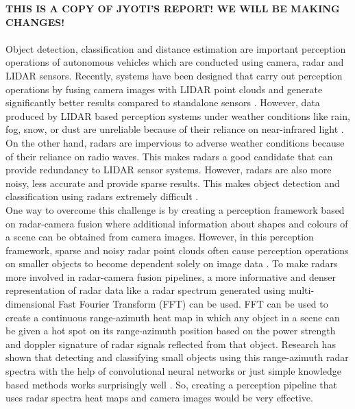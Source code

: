 \documentclass[11pt]{article}
\begin{document}
\textbf{THIS IS A COPY OF JYOTI'S REPORT! WE WILL BE MAKING CHANGES!}\\\\
Object detection, classification and distance estimation are important perception
operations of autonomous vehicles which are conducted using camera, radar and LIDAR
sensors. Recently, systems have been designed that carry out perception operations by fusing
camera images with LIDAR point clouds and generate significantly better results compared to
standalone sensors \cite{1}\cite{2}\cite{3}. However, data produced by LIDAR based perception systems
under weather conditions like rain, fog, snow, or dust are unreliable because of their reliance on
near-infrared light \cite{2}. On the other hand, radars are impervious to adverse weather conditions
because of their reliance on radio waves. This makes radars a good candidate that can provide
redundancy to LIDAR sensor systems. However, radars are also more noisy, less accurate and
provide sparse results. This makes object detection and classification using radars extremely
difficult \cite{2}.\\

One way to overcome this challenge is by creating a perception framework based on
radar-camera fusion where additional information about shapes and colours of a scene can be
obtained from camera images. However, in this perception framework, sparse and noisy radar
point clouds often cause perception operations on smaller objects to become dependent solely
on image data \cite{4}\cite{5}. To make radars more involved in radar-camera fusion pipelines, a more
informative and denser representation of radar data like a radar spectrum generated using
multi-dimensional Fast Fourier Transform (FFT) can be used. FFT can be used to create a
continuous range-azimuth heat map in which any object in a scene can be given a hot spot on
its range-azimuth position based on the power strength and doppler signature of radar signals
reflected from that object. Research has shown that detecting and classifying small objects
using this range-azimuth radar spectra with the help of convolutional neural networks or just
simple knowledge based methods works surprisingly well \cite{5}\cite{6}. So, creating a perception
pipeline that uses radar spectra heat maps and camera images would be very effective.\\
\end{document}

